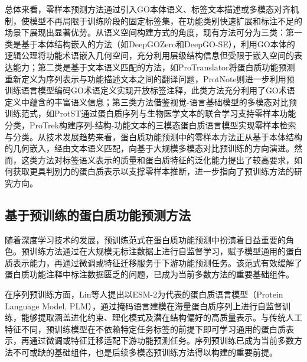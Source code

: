 总体来看，零样本预测方法通过引入GO本体语义、标签文本描述或多模态对齐机制，使模型不再局限于训练阶段的固定标签集，在功能类别快速扩展和标注不足的场景下展现出显著优势。从语义空间构建方式的角度，现有方法可分为三类：第一类是基于本体结构嵌入的方法（如DeepGOZero和DeepGO-SE），利用GO本体的逻辑公理将功能术语嵌入几何空间，充分利用层级结构信息但受限于嵌入空间的表达能力；第二类是基于文本语义匹配的方法，如ProTranslator\cite{gao2022protranslator}将蛋白质功能预测重新定义为序列表示与功能描述文本之间的翻译问题，ProtNote则进一步利用预训练语言模型编码GO术语定义实现开放标签注释，此类方法充分利用了GO术语定义中蕴含的丰富语义信息；第三类方法借鉴视觉-语言基础模型的多模态对比预训练范式，如ProtST\cite{xu2023protst}通过蛋白质序列与生物医学文本的联合学习支持零样本功能分类，ProTrek\cite{su2024protrek}构建序列-结构-功能文本的三模态蛋白质语言模型实现零样本检索与分类。从技术发展趋势来看，蛋白质功能预测中的零样本方法正从基于本体结构的几何嵌入，经由文本语义匹配，向基于大规模多模态对比预训练的方向演进。然而，这类方法对标签语义表示的质量和蛋白质特征的泛化能力提出了较高要求，如何获取更具判别力的蛋白质表示以支撑零样本推断，进一步指向了预训练方法的研究方向。

\subsection{基于预训练的蛋白质功能预测方法}

随着深度学习技术的发展，预训练范式在蛋白质功能预测中扮演着日益重要的角色。预训练方法通过在大规模无标注数据上进行自监督学习，赋予模型通用的蛋白质表示能力，再通过微调或特征迁移服务于下游功能预测任务。该范式有效缓解了蛋白质功能注释中标注数据匮乏的问题，已成为当前多数方法的重要基础组件。

在序列预训练方面，Lin等人\cite{lin2023evolutionary}提出以ESM-2为代表的蛋白质语言模型（Protein Language Model, PLM），通过掩码语言建模在海量蛋白质序列上进行自监督训练，能够提取涵盖进化约束、理化模式及潜在结构偏好的高质量表示。与传统人工特征不同，预训练模型在不依赖特定任务标签的前提下即可学习通用的蛋白质表示，再通过微调或特征迁移适配下游功能预测任务。序列预训练已成为当前多数方法不可或缺的基础组件，也是后续多模态预训练方法得以构建的重要前提。


